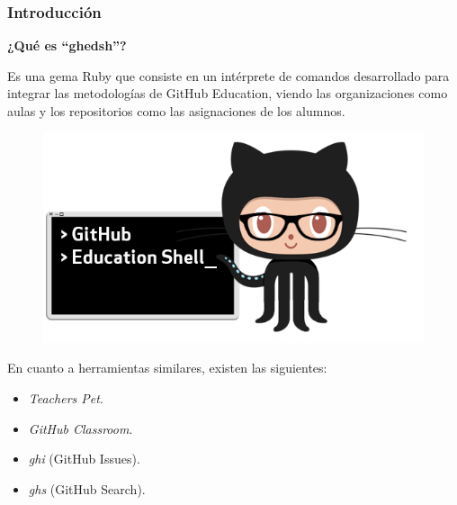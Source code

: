 \documentclass{beamer}
\begin{document}
\begin{frame}
  \frametitle{Introducción}
  \textbf{¿Qué es ``ghedsh''?}
  \bigskip

  Es una gema Ruby que consiste en un intérprete de comandos desarrollado para integrar las metodologías
  de GitHub Education, viendo las organizaciones como aulas y los repositorios como las asignaciones de los alumnos.
  
  \begin{center}
    \begin{figure}[!htb]  
        \includegraphics[width=\linewidth]{img/ghedsh-logo.png}
      \endminipage
    \end{figure}
  \end{center}

  \framebreak
  
  En cuanto a herramientas similares, existen las siguientes:
  \begin{itemize}
    \item {\it Teachers Pet}.
    \item {\it GitHub Classroom}.
    \item {\it ghi} (GitHub Issues).
    \item {\it ghs} (GitHub Search).
  \end{itemize}


\end{frame}
\end{document}
